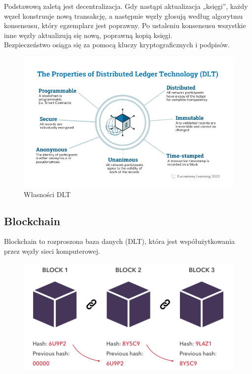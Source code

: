 \documentclass[12pt]{article}
\newenvironment{centerfig}
{\begin{figure}[H]\centering}
{\end{figure}}
\begin{document}
Podstawową zaletą jest decentralizacja. Gdy nastąpi aktualizacja „księgi”, każdy węzeł konstruuje nową transakcję, a następnie węzły głosują według algorytmu konsensusu, który egzemplarz jest poprawny. Po ustaleniu konsensusu wszystkie inne węzły aktualizują się nową, poprawną kopią księgi.\\
Bezpieczeństwo osiąga się za pomocą kluczy kryptograficznych i podpisów.

\begin{centerfig}
  \includegraphics[width=\textwidth]{2.png}
  \caption{Własności DLT\cite{2png}}
\end{centerfig}

\subsection{Blockchain}

Blockchain to rozproszona baza danych (DLT), która jest współużytkowania przez węzły sieci komputerowej.

\begin{centerfig}
  \includegraphics[width=\textwidth]{3.png}
\end{centerfig}
\end{document}
